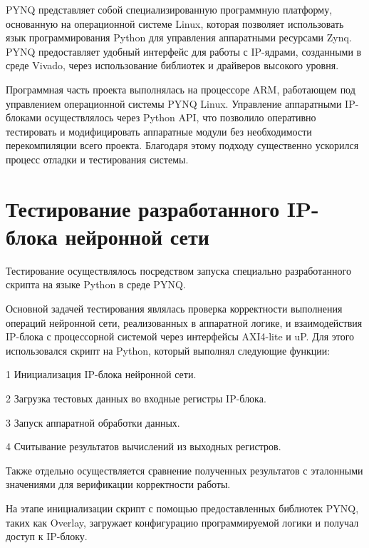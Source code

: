 PYNQ представляет собой 
специализированную программную платформу, основанную на операционной системе 
Linux, которая позволяет использовать язык программирования Python для 
управления аппаратными ресурсами Zynq\cite{PYNQ}. PYNQ предоставляет удобный интерфейс
для работы с IP-ядрами, созданными в среде Vivado, через использование 
библиотек и драйверов высокого уровня.

Программная часть проекта выполнялась на процессоре ARM, работающем под 
управлением операционной системы PYNQ Linux. Управление аппаратными IP-блоками 
осуществлялось через Python API, что позволило оперативно тестировать и 
модифицировать аппаратные модули без необходимости перекомпиляции всего 
проекта. Благодаря этому подходу существенно ускорился процесс отладки и 
тестирования системы.

\section{Тестирование разработанного IP-блока нейронной сети}\par
\hspace*{12.5 mm}Тестирование осуществлялось посредством запуска специально 
разработанного скрипта на языке Python в среде PYNQ.

Основной задачей тестирования являлась проверка корректности выполнения 
операций нейронной сети, реализованных в аппаратной логике, и 
взаимодействия IP-блока с процессорной системой через интерфейсы AXI4-lite и uP. 
Для этого использовался скрипт на Python, который выполнял следующие функции: 

    1 Инициализация IP-блока нейронной сети. 

    2 Загрузка тестовых данных во входные регистры IP-блока. 
    
    3 Запуск аппаратной обработки данных. 
    
    4 Считывание результатов вычислений из выходных регистров. 
    
Также отдельно осуществляется сравнение полученных результатов с эталонными 
значениями для верификации корректности работы. 

На этапе инициализации скрипт с помощью предоставленных библиотек PYNQ, таких 
как {Overlay}, загружает конфигурацию программируемой логики и получал доступ 
к IP-блоку.

